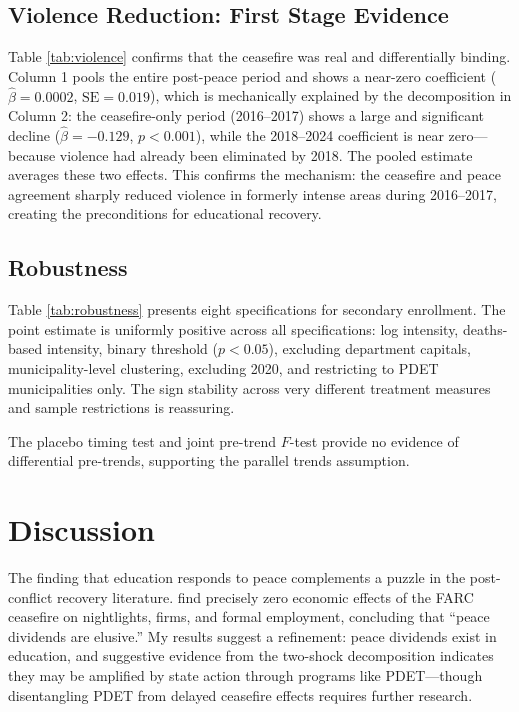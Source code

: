 \documentclass[12pt]{article}
\begin{document}
\subsection{Violence Reduction: First Stage Evidence}



Table \ref{tab:violence} confirms that the ceasefire was real and differentially binding. Column 1 pools the entire post-peace period and shows a near-zero coefficient ($\hat{\beta}=0.0002$, $\text{SE}=0.019$), which is mechanically explained by the decomposition in Column 2: the ceasefire-only period (2016--2017) shows a large and significant decline ($\hat{\beta}=-0.129$, $p<0.001$), while the 2018--2024 coefficient is near zero---because violence had already been eliminated by 2018. The pooled estimate averages these two effects. This confirms the mechanism: the ceasefire and peace agreement sharply reduced violence in formerly intense areas during 2016--2017, creating the preconditions for educational recovery.

\subsection{Robustness}



Table \ref{tab:robustness} presents eight specifications for secondary enrollment. The point estimate is uniformly positive across all specifications: log intensity, deaths-based intensity, binary threshold ($p<0.05$), excluding department capitals, municipality-level clustering, excluding 2020, and restricting to PDET municipalities only. The sign stability across very different treatment measures and sample restrictions is reassuring.

The placebo timing test and joint pre-trend $F$-test provide no evidence of differential pre-trends, supporting the parallel trends assumption.


\section{Discussion}

The finding that education responds to peace complements a puzzle in the post-conflict recovery literature. \citet{fajardo2023peace} find precisely zero economic effects of the FARC ceasefire on nightlights, firms, and formal employment, concluding that ``peace dividends are elusive.'' My results suggest a refinement: peace dividends exist in education, and suggestive evidence from the two-shock decomposition indicates they may be amplified by state action through programs like PDET---though disentangling PDET from delayed ceasefire effects requires further research.
\end{document}
